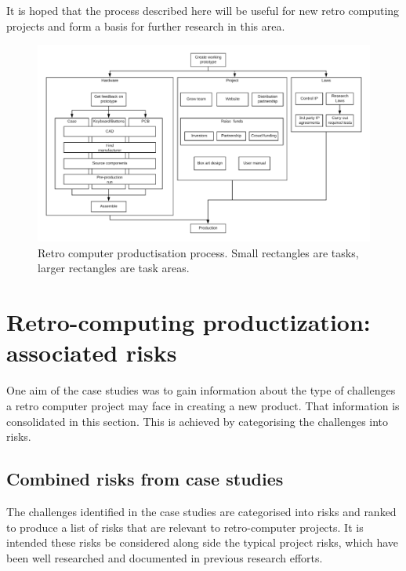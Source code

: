 It is hoped that the process described here will be useful for new retro computing projects and form a basis for further research in this area. \\

\begin{figure} \begin{center}
\includegraphics[width= 1\linewidth]{pics/case_study_process} 
\end{center} 
\caption{Retro computer productisation process. Small rectangles are tasks, larger rectangles are task areas.}
\label{case_study_process}
\end{figure} 

\section{Retro-computing productization: associated risks}
One aim of the case studies was to gain information about the type of challenges a retro computer project may face in creating a new product. That information is consolidated in this section. This is achieved by categorising the challenges into risks.


\subsection{Combined risks from case studies}
The challenges identified in the case studies are categorised into risks and ranked to produce a list of risks that are relevant to retro-computer projects. It is intended these risks be considered along side the typical project risks, which have been well researched and documented in previous research efforts. 

